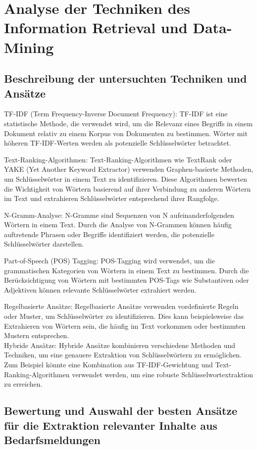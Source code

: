 \chapter{Analyse der Techniken des Information Retrieval und Data-Mining}
\label{chap:staffingadvisor}

\section{Beschreibung der untersuchten Techniken und Ansätze}
TF-IDF (Term Frequency-Inverse Document Frequency): TF-IDF ist eine statistische Methode, die verwendet wird, um die Relevanz eines Begriffs in einem Dokument relativ zu einem Korpus von Dokumenten zu bestimmen. Wörter mit höheren TF-IDF-Werten werden als potenzielle Schlüsselwörter betrachtet.\\
\cite{bafna2016document}
\cite{ramos2003using}

Text-Ranking-Algorithmen: Text-Ranking-Algorithmen wie TextRank oder YAKE (Yet Another Keyword Extractor) verwenden Graphen-basierte Methoden, um Schlüsselwörter in einem Text zu identifizieren. Diese Algorithmen bewerten die Wichtigkeit von Wörtern basierend auf ihrer Verbindung zu anderen Wörtern im Text und extrahieren Schlüsselwörter entsprechend ihrer Rangfolge.\\
\cite{mihalcea2004textrank}
\cite{zhang2020empirical}
\cite{pay2019ensemble}

N-Gramm-Analyse: N-Gramme sind Sequenzen von N aufeinanderfolgenden Wörtern in einem Text. Durch die Analyse von N-Grammen können häufig auftretende Phrasen oder Begriffe identifiziert werden, die potenzielle Schlüsselwörter darstellen.\\
\cite{pirk2019implementierung}


Part-of-Speech (POS) Tagging: POS-Tagging wird verwendet, um die grammatischen Kategorien von Wörtern in einem Text zu bestimmen. Durch die Berücksichtigung von Wörtern mit bestimmten POS-Tags wie Substantiven oder Adjektiven können relevante Schlüsselwörter extrahiert werden.\\
\cite{kumawat2015pos}
\cite{nakagawa2007hybrid}

Regelbasierte Ansätze: Regelbasierte Ansätze verwenden vordefinierte Regeln oder Muster, um Schlüsselwörter zu identifizieren. Dies kann beispielsweise das Extrahieren von Wörtern sein, die häufig im Text vorkommen oder bestimmten Mustern entsprechen.\\

Hybride Ansätze: Hybride Ansätze kombinieren verschiedene Methoden und Techniken, um eine genauere Extraktion von Schlüsselwörtern zu ermöglichen. Zum Beispiel könnte eine Kombination aus TF-IDF-Gewichtung und Text-Ranking-Algorithmen verwendet werden, um eine robuste Schlüsselwortextraktion zu erreichen.\\

\section{Bewertung und Auswahl der besten Ansätze für die Extraktion relevanter Inhalte aus Bedarfsmeldungen}

\newpage